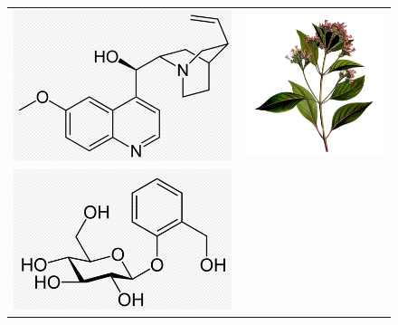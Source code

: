 \documentclass[11pt,a4paper]{report}
\begin{document}
\begin{figure}[h!]
	\begin{center}
		\begin{tabular}{cc}
  		\includegraphics[scale = 0.7]{quinine.png} &
   		\includegraphics[scale = 0.7]{quinquina.png}\\
   		\includegraphics[scale = 0.7]{salicyline.png} &

\end{tabular}
\end{center}
\end{figure}
\end{document}
